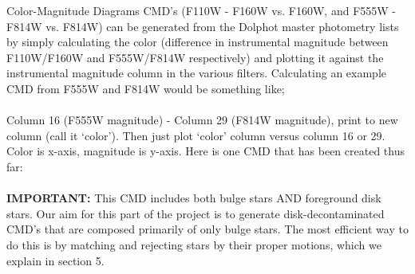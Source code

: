 \documentclass[12pt]{article}
\begin{document}
\begin{section}{Color-Magnitude Diagrams}
CMD's (F110W - F160W vs. F160W, and F555W - F814W vs. F814W) can be generated from the Dolphot master photometry lists by simply calculating the color (difference in instrumental magnitude between F110W/F160W and F555W/F814W respectively) and plotting it against the instrumental magnitude column in the various filters. Calculating an example CMD from F555W and F814W would be something like; \\
\\
Column 16 (F555W magnitude) - Column 29 (F814W magnitude), print to new column (call it `color'). Then just plot `color' column versus column 16 or 29. Color is x-axis, magnitude is y-axis. Here is one CMD that has been created thus far: \\
{} \\
\textbf{IMPORTANT:} This CMD includes both bulge stars AND foreground disk stars. Our aim for this part of the project is to generate disk-decontaminated CMD's that are composed primarily of only bulge stars. The most efficient way to do this is by matching and rejecting stars by their proper motions, which we explain in section 5.

\end{section}
\end{document}
